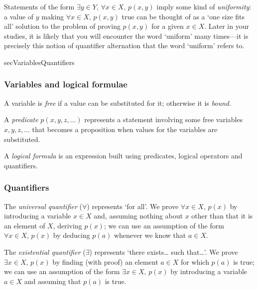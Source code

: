 Statements of the form $\exists y \in Y,\, \forall x \in X,\, p(x,y)$ imply some kind of \textit{uniformity}: a value of $y$ making $\forall x \in X,\, p(x,y)$ true can be thought of as a `one size fits all' solution to the problem of proving $p(x,y)$ for a given $x \in X$. Later in your studies, it is likely that you will encounter the word `uniform' many times---it is precisely this notion of quantifier alternation that the word `uniform' refers to.

\begin{tldr}{secVariablesQuantifiers}

\subsubsection*{Variables and logical formulae}

\begin{tldrlist}
A variable is \textit{free} if a value can be substituted for it; otherwise it is \textit{bound}.

A \textit{predicate} $p(x,y,z,\dots)$ represents a statement involving some free variables $x,y,z,\dots{}$ that becomes a proposition when values for the variables are substituted.

A \textit{logical formula} is an expression built using predicates, logical operators and quantifiers.
\end{tldrlist}

\subsubsection*{Quantifiers}

\begin{tldrlist}
The \textit{universal quantifier} ($\forall$) represents `for all'. We prove $\forall x \in X,\, p(x)$ by introducing a variable $x \in X$ and, assuming nothing about $x$ other than that it is an element of $X$, deriving $p(x)$; we can use an assumption of the form $\forall x \in X,\, p(x)$ by deducing $p(a)$ whenever we know that $a \in X$.

The \textit{existential quantifier} ($\exists$) represents `there exists\dots{} such that\dots{}'. We prove $\exists x \in X,\, p(x)$ by finding (with proof) an element $a \in X$ for which $p(a)$ is true; we can use an assumption of the form $\exists x \in X,\, p(x)$ by introducing a variable $a \in X$ and assuming that $p(a)$ is true.


\end{tldrlist}
\end{tldr}
